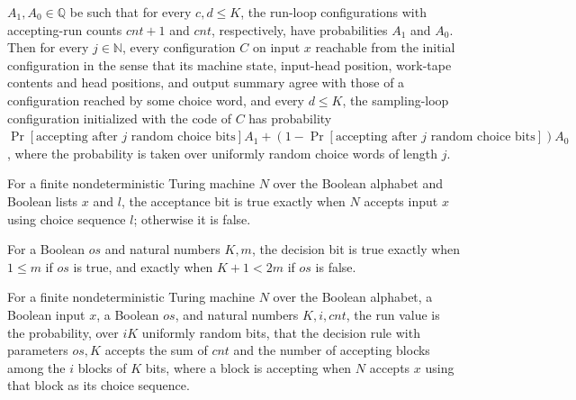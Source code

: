 \begin{theorem}
$A_1,A_0\in\mathbb{Q}$ be such that for every $c,d\le K$, the run-loop configurations
with accepting-run counts $cnt+1$ and $cnt$, respectively, have probabilities $A_1$ and
$A_0$. Then for every $j\in\mathbb{N}$, every configuration $C$ on input $x$ reachable
from the initial configuration in the sense that its machine state, input-head position,
work-tape contents and head positions, and output summary agree with those of a
configuration reached by some choice word, and every $d\le K$, the sampling-loop
configuration initialized with the code of $C$ has probability $\Pr[\text{accepting
after }j\text{ random choice bits}]A_1+(1-\Pr[\text{accepting after }j\text{ random
choice bits}])A_0$, where the probability is taken over uniformly random choice words of
length $j$.
\end{theorem}

\begin{definition}
\label{Randomized.PolyAmp.accBit}
\leanok
{}
For a finite nondeterministic Turing machine $N$ over the Boolean alphabet and Boolean
lists $x$ and $l$, the acceptance bit is true exactly when $N$ accepts input $x$ using
choice sequence $l$; otherwise it is false.
\end{definition}

\begin{definition}
\label{Randomized.PolyAmp.decRule}
\leanok
For a Boolean $os$ and natural numbers $K,m$, the decision bit is true exactly when
$1\le m$ if $os$ is true, and exactly when $K+1<2m$ if $os$ is false.
\end{definition}

\begin{definition}
\label{Randomized.PolyAmp.runVal}
\leanok
{}
For a finite nondeterministic Turing machine $N$ over the Boolean alphabet, a Boolean
input $x$, a Boolean $os$, and natural numbers $K,i,cnt$, the run value is the
probability, over $iK$ uniformly random bits, that the decision rule with parameters
$os,K$ accepts the sum of $cnt$ and the number of accepting blocks among the $i$ blocks
of $K$ bits, where a block is accepting when $N$ accepts $x$ using that block as its
choice sequence.
\end{definition}

